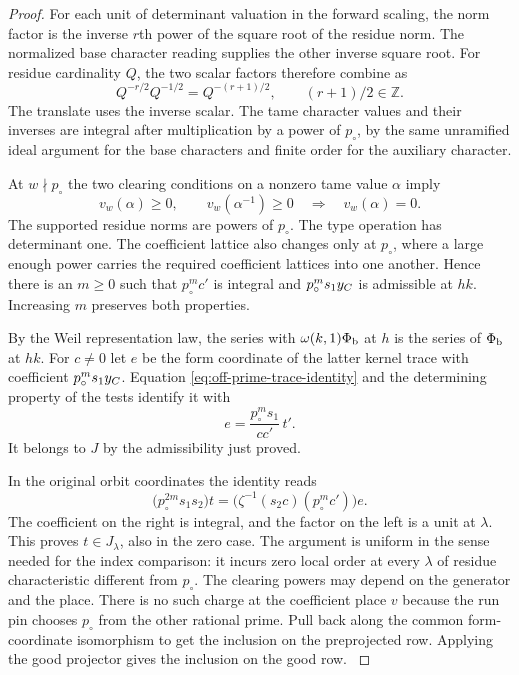 \begin{proof}
For each unit of determinant valuation in the forward
scaling, the norm factor is the inverse \(r\)th power
of the square root of the residue norm. The normalized
base character reading supplies the other inverse
square root. For residue cardinality \(Q\), the two scalar factors therefore combine as
\[
  Q^{-r/2}Q^{-1/2}=Q^{-(r+1)/2},\qquad (r+1)/2\in\mathbb Z.
\]
The translate uses the inverse scalar. The tame
character values and their inverses are integral
after multiplication by a power of \(p_\circ\), by
the same unramified ideal argument for the base
characters and finite order for the auxiliary
character.

At \(w\nmid p_\circ\) the two clearing conditions on a nonzero tame value \(\alpha\) imply
\[
  v_w(\alpha)\ge0,\qquad v_w(\alpha^{-1})\ge0\quad\Longrightarrow\quad v_w(\alpha)=0 .
\]
 The supported residue norms are powers
of \(p_\circ\). The type operation has determinant one.
The coefficient lattice also changes only at
\(p_\circ\), where a large enough power carries the
required coefficient lattices into one another. Hence
there is an \(m\ge0\) such that \(p_\circ^m c'\) is
integral and \(p_\circ^m s_1 y_{C}\) is admissible at
\(hk\). Increasing \(m\) preserves both properties.
\label{cor:paired-off-prime-trace-8}

By the Weil representation law, the series with
\(\omega(k,1)\Phi_{\rm b}\) at \(h\) is the series of
\(\Phi_{\rm b}\) at \(hk\). For \(c\ne0\) let \(e\) be the
form coordinate of the latter kernel trace with
coefficient \(p_\circ^m s_1y_{C}\). Equation
\eqref{eq:off-prime-trace-identity} and the determining
property of the tests identify it with
\[
               e=\frac{p_\circ^m s_1}{cc'}\,t'.
\]
It belongs to \(J\) by the admissibility just proved.

In the original orbit coordinates the identity reads
\[
       \bigl(p_\circ^{2m}s_1s_2\bigr)t
        =\bigl(\zeta^{-1}(s_2c)(p_\circ^m c')\bigr)e .
\]
The coefficient on the right is integral, and the
factor on the left is a unit at \(\lambda\). This proves
\(t\in J_\lambda\), also in the zero case. The argument
is uniform in the sense needed for the index comparison:
it incurs zero local order at every \(\lambda\) of
residue characteristic different from \(p_\circ\).
The clearing powers may depend on the generator and
the place. There is no such charge at the coefficient
place \(v\) because the run pin chooses \(p_\circ\) from
the other rational prime. Pull back along the common
form-coordinate isomorphism to get the inclusion on
the preprojected row. Applying the good projector
gives the inclusion on the good row.
\label{cor:paired-off-prime-trace-9}
\end{proof}
